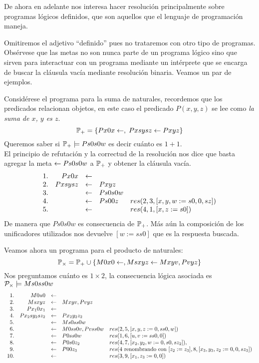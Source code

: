 \documentclass[11pt,letterpaper]{article}
\begin{document}

De ahora en adelante nos interesa hacer resoluci\'on principalmente sobre
programas l\'ogicos definidos, que son aquellos que el lenguaje de
programaci\'on {\pl} maneja.


Omitiremos el adjetivo \enquote{definido} pues no trataremos con otro tipo
de programas. Obs\'ervese que las metas no son nunca parte de un
programa l\'ogico sino que sirven para interactuar con un programa
mediante un int\'erprete que se encarga de buscar la cl\'ausula vac\'ia
mediante resoluci\'on binaria. Veamos un par de ejemplos.

\beje
Consid\'erese el programa para la suma de naturales, recordemos que los predicados relacionan objetos, en este caso el predicado $P(x,y,z)$ se lee como 
\textit{la suma de $x$, $y$ es $z$}.
$$\P_+=\{Px0x\pmi,\; Pxsysz \pmi Pxyz\}$$
Queremos saber si $\P_+\models Ps0s0w$ es decir cu\'anto es $1+1$. \\
El principio de refutaci\'on y la correctud de la resoluci\'on nos dice que 
basta agregar la meta $\pmi Ps0s0w$ a $\P_+$ y obtener la cl\'ausula vac\'ia.
\[
\ba{rrrll}
1. & Px0x & \pmi & \\
2. & Pxsysz & \pmi   & Pxyz &\\
3. & & \pmi & Ps0s0w &\\
4. & & \pmi & Ps00z & res(2,3,[x,y,w:=s0,0,sz]) \\
5. & & \pmi &    &res(4,1,[x,z:=s0]) 
\ea
\]
De manera que $Ps0s0w$ es consecuencia de $\P_+$. M\'as a\'un la composici\'on
de los unificadores utilizados nos devuelve $[w:=ss0]$ que es la respuesta 
buscada.
\eeje

\beje
Veamos ahora un programa para el producto de naturales:
$$ \P_\times = \P_+\cup\{M0x0\pmi,Msxyz\pmi Mxyv,Pvyz\} $$
Nos preguntamos cu\'anto es $1\times 2$, la consecuencia l\'ogica asociada
es $\Pe_\times\models Ms0ss0w$
\[
\ba{rrrll}
1. & M0u0 & \pmi  &\\
2. & Msxyz & \pmi & Mxyv, Pvyz &\\
3. & Px_10x_1 & \pmi & &\\
4. & Px_2sy_2sz_2 & \pmi   & Px_2y_2z_2& \\
5. & & \pmi & Ms0ss0w & \\
6. & & \pmi & M0ss0v, Pvss0w & res(2,5,[x,y,z:=0,ss0,w]) \\
7. & & \pmi & P0ss0w   & res(1,6,[u,v:=ss0,0]) \\
8. & & \pmi & P0s0z_2 & res(4,7,[x_2,y_2,w:=0,s0,sz_2]), \\
9. & & \pmi & P00z_3  & res(4\text{ renombrando con }
[z_2:=z_3],8,[x_3,y_3,z_2:=0,0,sz_3])\\
10. & & \pmi &  & res(3,9,[x_1,z_3:=0,0])
\ea
\]
\end{document}
